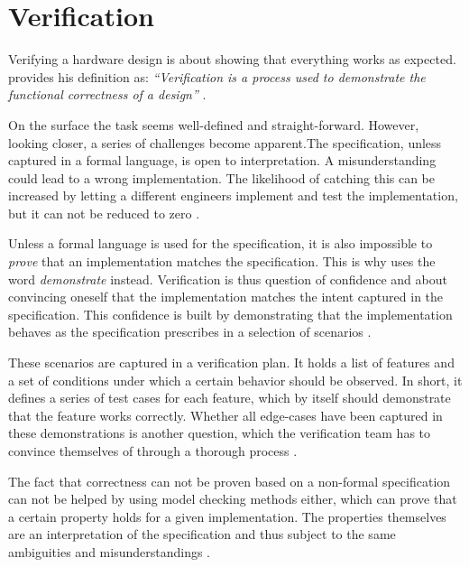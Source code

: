 \section{Verification} %

Verifying a hardware design is about showing that everything works as expected. \citeauthor{bergeron2012writing}
provides his definition as: \textit{``Verification is a process used to demonstrate the functional correctness of a
design''} \cite[Ch. 1]{bergeron2012writing}.

On the surface the task seems well-defined and straight-forward. However, looking closer, a series of challenges
become apparent.The specification, unless captured in a formal language, is open to interpretation. A
misunderstanding could lead to a wrong implementation. The likelihood of catching this can be increased by
letting a different engineers implement and test the implementation, but it can not be reduced to zero \cite[Ch.
1]{bergeron2012writing}.

Unless a formal language is used for the specification, it is also impossible to \textit{prove} that an
implementation matches the specification. This is why \citeauthor{bergeron2012writing} uses the word
\textit{demonstrate} instead. Verification is thus question of confidence and about convincing oneself that the
implementation matches the intent captured in the specification. This confidence is built by demonstrating that the
implementation behaves as the specification prescribes in a selection of scenarios \cite[Ch. 1]{bergeron2012writing}.

These scenarios are captured in a verification plan. It holds a list of features and a set of conditions under which
a certain behavior should be observed. In short, it defines a series of test cases for each feature, which by itself
should demonstrate that the feature works correctly. Whether all edge-cases have been captured in these
demonstrations is another question, which the verification team has to convince themselves of through a thorough
process \cite[Ch. 1]{bergeron2012writing}.

The fact that correctness can not be proven based on a non-formal specification can not be helped by using model checking
methods either, which can prove that a certain property holds for a given implementation. The properties themselves
are an interpretation of the specification and thus subject to the same ambiguities and misunderstandings \cite[Ch.
1]{bergeron2012writing}.

